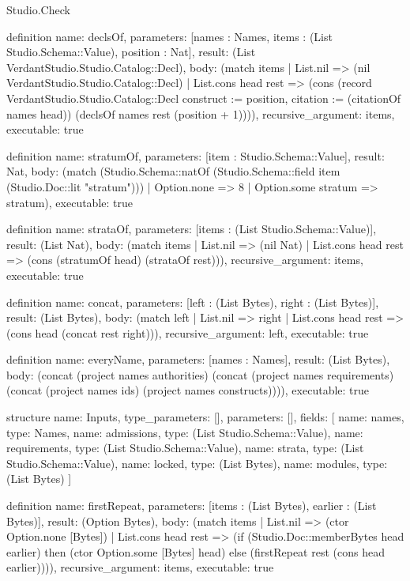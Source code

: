\begin{lexlean}{Studio.Check}
\begin{semanticmodule}
definition{
  name: declsOf,
  parameters: [names : Names, items : (List Studio.Schema::Value), position : Nat],
  result: (List VerdantStudio.Studio.Catalog::Decl),
  body: (match items
    | List.nil => (nil VerdantStudio.Studio.Catalog::Decl)
    | List.cons head rest => (cons (record VerdantStudio.Studio.Catalog::Decl {construct := position, citation := (citationOf names head)}) (declsOf names rest (position + 1)))),
  recursive_argument: items,
  executable: true
}

definition{
  name: stratumOf,
  parameters: [item : Studio.Schema::Value],
  result: Nat,
  body: (match (Studio.Schema::natOf (Studio.Schema::field item (Studio.Doc::lit "stratum")))
    | Option.none => 8
    | Option.some stratum => stratum),
  executable: true
}

definition{
  name: strataOf,
  parameters: [items : (List Studio.Schema::Value)],
  result: (List Nat),
  body: (match items
    | List.nil => (nil Nat)
    | List.cons head rest => (cons (stratumOf head) (strataOf rest))),
  recursive_argument: items,
  executable: true
}

definition{
  name: concat,
  parameters: [left : (List Bytes), right : (List Bytes)],
  result: (List Bytes),
  body: (match left
    | List.nil => right
    | List.cons head rest => (cons head (concat rest right))),
  recursive_argument: left,
  executable: true
}

definition{
  name: everyName,
  parameters: [names : Names],
  result: (List Bytes),
  body: (concat (project names authorities) (concat (project names requirements) (concat (project names ids) (project names constructs)))),
  executable: true
}

structure{
  name: Inputs,
  type_parameters: [],
  parameters: [],
  fields: [
    {name: names, type: Names},
    {name: admissions, type: (List Studio.Schema::Value)},
    {name: requirements, type: (List Studio.Schema::Value)},
    {name: strata, type: (List Studio.Schema::Value)},
    {name: locked, type: (List Bytes)},
    {name: modules, type: (List Bytes)}
  ]
}

definition{
  name: firstRepeat,
  parameters: [items : (List Bytes), earlier : (List Bytes)],
  result: (Option Bytes),
  body: (match items
    | List.nil => (ctor Option.none [Bytes])
    | List.cons head rest => (if (Studio.Doc::memberBytes head earlier) then (ctor Option.some [Bytes] head) else (firstRepeat rest (cons head earlier)))),
  recursive_argument: items,
  executable: true
}


\end{semanticmodule}
\end{lexlean}
